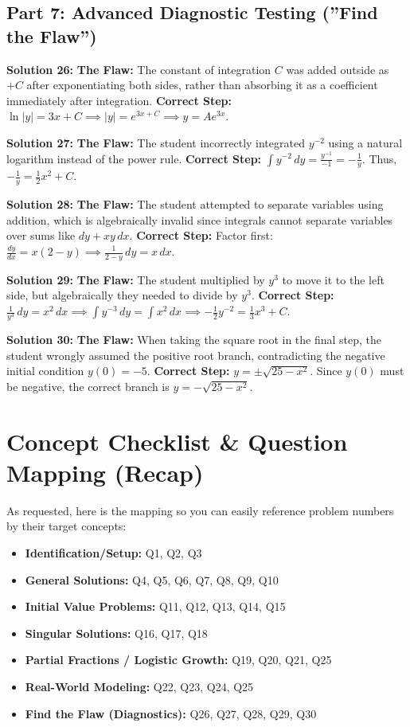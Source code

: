 \documentclass[11pt]{article}
\begin{document}
\subsection*{Part 7: Advanced Diagnostic Testing (''Find the Flaw'')}

\textbf{Solution 26:}
\textbf{The Flaw:} The constant of integration $C$ was added outside as $+C$ after exponentiating both sides, rather than absorbing it as a coefficient immediately after integration.
\textbf{Correct Step:} $\ln|y| = 3x + C \implies |y| = e^{3x+C} \implies y = A e^{3x}$.

\textbf{Solution 27:}
\textbf{The Flaw:} The student incorrectly integrated $y^{-2}$ using a natural logarithm instead of the power rule.
\textbf{Correct Step:} $\int y^{-2} \, dy = \frac{y^{-1}}{-1} = -\frac{1}{y}$. Thus, $-\frac{1}{y} = \frac{1}{2}x^2 + C$.

\textbf{Solution 28:}
\textbf{The Flaw:} The student attempted to separate variables using addition, which is algebraically invalid since integrals cannot separate variables over sums like $dy + xy \, dx$.
\textbf{Correct Step:} Factor first: $\frac{dy}{dx} = x(2 - y) \implies \frac{1}{2-y} \, dy = x \, dx$.

\textbf{Solution 29:}
\textbf{The Flaw:} The student multiplied by $y^3$ to move it to the left side, but algebraically they needed to divide by $y^3$.
\textbf{Correct Step:} $\frac{1}{y^3} \, dy = x^2 \, dx \implies \int y^{-3} \, dy = \int x^2 \, dx \implies -\frac{1}{2}y^{-2} = \frac{1}{3}x^3 + C$.

\textbf{Solution 30:}
\textbf{The Flaw:} When taking the square root in the final step, the student wrongly assumed the positive root branch, contradicting the negative initial condition $y(0) = -5$.
\textbf{Correct Step:} $y = \pm\sqrt{25 - x^2}$. Since $y(0)$ must be negative, the correct branch is $y = -\sqrt{25 - x^2}$.

\newpage
\section{Concept Checklist \& Question Mapping (Recap)}
As requested, here is the mapping so you can easily reference problem numbers by their target concepts:

\begin{itemize}
    \item \textbf{Identification/Setup:} Q1, Q2, Q3
    \item \textbf{General Solutions:} Q4, Q5, Q6, Q7, Q8, Q9, Q10
    \item \textbf{Initial Value Problems:} Q11, Q12, Q13, Q14, Q15
    \item \textbf{Singular Solutions:} Q16, Q17, Q18
    \item \textbf{Partial Fractions / Logistic Growth:} Q19, Q20, Q21, Q25
    \item \textbf{Real-World Modeling:} Q22, Q23, Q24, Q25
    \item \textbf{Find the Flaw (Diagnostics):} Q26, Q27, Q28, Q29, Q30
\end{itemize}
\end{document}
